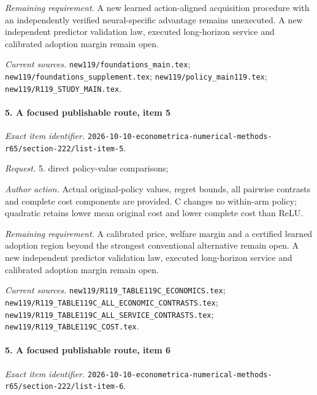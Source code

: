 \par\emph{Remaining requirement.} A new learned action-aligned acquisition procedure with an independently verified neural-specific advantage remains unexecuted. A new independent predictor validation law, executed long-horizon service and calibrated adoption margin remain open.

\par\emph{Current sources.} \nolinkurl{new119/foundations_main.tex}; \nolinkurl{new119/foundations_supplement.tex}; \nolinkurl{new119/policy_main119.tex}; \nolinkurl{new119/R119_STUDY_MAIN.tex}.

\paragraph{5. A focused publishable route, item 5}

\emph{Exact item identifier.} \nolinkurl{2026-10-10-econometrica-numerical-methods-r65/section-222/list-item-5}.

\par\emph{Request.} 5. direct policy-value comparisons;

\par\emph{Author action.} Actual original-policy values, regret bounds, all pairwise contrasts and complete cost components are provided. C changes no within-arm policy; quadratic retains lower mean original cost and lower complete cost than ReLU.

\par\emph{Remaining requirement.} A calibrated price, welfare margin and a certified learned adoption region beyond the strongest conventional alternative remain open. A new independent predictor validation law, executed long-horizon service and calibrated adoption margin remain open.

\par\emph{Current sources.} \nolinkurl{new119/R119_TABLE119C_ECONOMICS.tex}; \nolinkurl{new119/R119_TABLE119C_ALL_ECONOMIC_CONTRASTS.tex}; \nolinkurl{new119/R119_TABLE119C_ALL_SERVICE_CONTRASTS.tex}; \nolinkurl{new119/R119_TABLE119C_COST.tex}.

\paragraph{5. A focused publishable route, item 6}

\emph{Exact item identifier.} \nolinkurl{2026-10-10-econometrica-numerical-methods-r65/section-222/list-item-6}.

